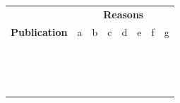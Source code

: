 \documentclass[a4paper,12pt]{article}
\newcommand{\xmark}{\color{red}\ding{53}}%
\newcommand{\cmark}{\color{green}\ding{51}}%
\begin{document}
\begin{figure}[H]
    \centering
    \begin{table}[H]
    \begin{tabularx}{\textwidth}{| @{} c | c | c | c| c| c| c| c|}
    \cline{1-8}
    & \multicolumn{7}{c}{\textbf{Reasons}} \\
    \cline{1-8}
    \textbf{Publication} & a & b & c & d & e & f & g\\ 
    \cline{1-8}
    \cite{BD29}        & &  &  &  &  &  &  \\        \cline{1-8}
    \cite{BD25}        &  &  &  &  &  &  &  \\       \cline{1-8}
    \cite{BD38}        & \xmark & \cmark & \cmark  & \xmark  & \cmark  & \cmark  & \xmark \\     \cline{1-8}
    \cite{BD06}        & \xmark & \cmark  & \xmark  & \xmark & \cmark & \xmark  & \cmark  \\        \cline{1-8}
    \cite{BD40}        & \xmark  & \cmark  &  \xmark  & \xmark  & \xmark  & \xmark & \cmark \\        \cline{1-8}
    \cite{BD15}     & \xmark & \xmark & \xmark  & \xmark  & \xmark  & \xmark  & \xmark  \\        \cline{1-8}
    \cite{BD31}     &  \xmark & \xmark & \xmark  & \xmark  & \xmark & \xmark &  \cmark \\        \cline{1-8}
    \cite{BD14}        & \xmark & \cmark & \xmark  &  \cmark & \cmark & \xmark  & \cmark  \\        \cline{1-8}
    \cite{BD41}        &  \xmark & \cmark & \cmark  &  \xmark & \cmark & \cmark &  \cmark \\        \cline{1-8}
    \cite{BD09}        & \xmark & \cmark  & \cmark  & \xmark  & \cmark & \xmark  & \xmark  \\        \cline{1-8}
    \cite{BD18}        & \xmark & \cmark  & \cmark  & \xmark & \xmark  & \xmark & \cmark  \\        \cline{1-8}
    \cite{BD42}       & \xmark & \cmark  & \cmark & \xmark  & \xmark      & \xmark  & \cmark \\        \cline{1-8}
    \cite{BD19}         & \xmark & \xmark  & \xmark  & \cmark & \cmark  & \xmark  & \cmark  \\        \cline{1-8}
    \cite{BD48}         & \cmark & \cmark  &  \cmark & \cmark & \cmark & \xmark  & \cmark  \\        \cline{1-8}
    \cite{BD44}         & \cmark & \cmark & \cmark  &  \xmark & \cmark  & \xmark & \cmark  \\        \cline{1-8}

\end{tabularx}
\end{table}
\end{figure}
\end{document}
